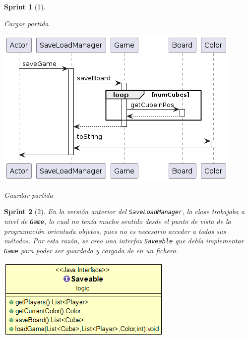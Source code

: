 \documentclass[12pt,a4paper,openright]{book}
\theoremstyle{break}
\newtheorem*{sprint}{Sprint}
\begin{document}
\begin{sprint}[1]
\begin{center}
Cargar partida
\end{center}

\begin{center}
\centering
\includegraphics[scale=0.5]{save-game-sprint1.png}

Guardar partida
\end{center}
\end{sprint}

\begin{sprint}[2]
En la versión anterior del \texttt{SaveLoadManager}, la clase trabajaba a nivel de \texttt{Game}, lo cual no tenía mucho sentido desde el punto de vista de la programación orientada objetos, pues no es necesario acceder a todos sus métodos. Por esta razón, se creo una interfaz \texttt{Saveable} que debía implementar \texttt{Game} para poder ser guardada y cargada de en un fichero.

\begin{center}
\centering
\includegraphics[scale=0.5]{saveable-sprint2.png}
\end{center}

\end{sprint}
\end{document}

